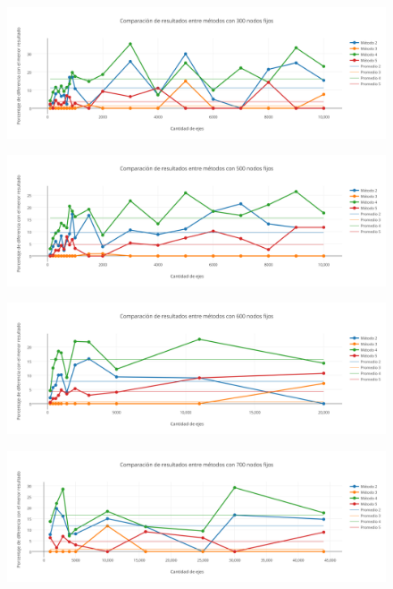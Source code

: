   \begin{figure}[h!]
   \begin{center}
 	\includegraphics[scale=0.55]{imagenes/local/resultados/300nodos.png}
   \end{center}
 \end{figure}
 

  \begin{figure}[h!]
   \begin{center}
 	\includegraphics[scale=0.55]{imagenes/local/resultados/500nodos.png}
   \end{center}
 \end{figure}
 
 \newpage
   \begin{figure}[h!]
   \begin{center}
 	\includegraphics[scale=0.55]{imagenes/local/resultados/600nodos.png}
   \end{center}
 \end{figure}

  \begin{figure}[h!]
   \begin{center}
 	\includegraphics[scale=0.55]{imagenes/local/resultados/700nodos.png}
   \end{center}
 \end{figure} 


\newpage